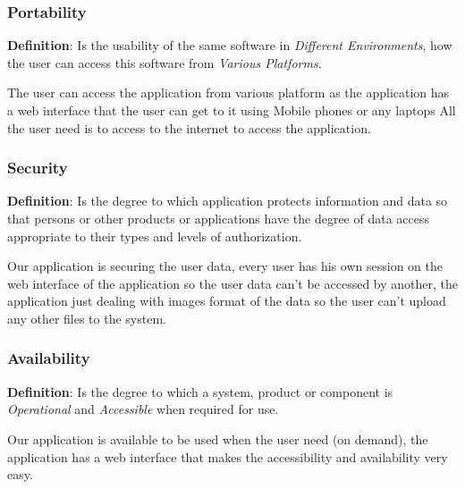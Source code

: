 \documentclass[12pt]{article}
\begin{document}
			\subsubsection{Portability}
				\textbf{Definition}: Is the usability of the same software in \textit{Different Environments}, how the user can access this software from \textit{Various Platforms}.
				
				The user can access the application from various platform as the application has a web interface that the user can get to it using Mobile phones or any laptops All the user need is to access to the internet to access the application.
			\subsubsection{Security}
				\textbf{Definition}: Is the degree to which application protects information and data so that persons or other products or applications have the degree of data access appropriate to their types and levels of authorization.
				
				Our application is securing the user data, every user has his own session on the web interface of the application so the user data can't be accessed by another, the application just dealing with images format of the data so the user can't upload any other files to the system.
			\subsubsection{Availability}
				\textbf{Definition}: Is the degree to which a system, product or component is \textit{Operational} and \textit{Accessible} when required for use. 
				
				Our application is available to be used when the user need (on demand), the application has a web interface that makes the accessibility and availability very easy.
\end{document}
